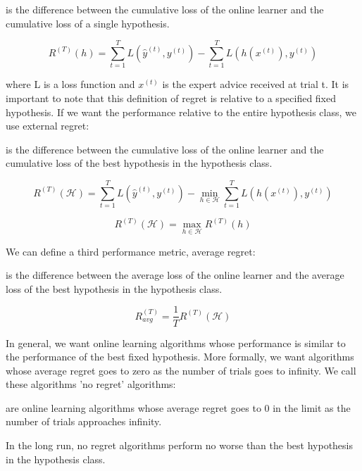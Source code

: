 \documentclass[11pt]{article}
\begin{document}
 is the difference between the cumulative loss of the online learner and the cumulative loss of a single hypothesis. 

$$R^{(T)}(h) = \sum_{t=1}^{T} L(\hat{y}^{(t)}, y^{(t)}) - \sum_{t=1}^{T}L(h({x}^{(t)}), y^{(t)})$$

\normalfont

where L is a loss function and ${x}^{(t)}$ is the expert advice received at trial t. It is important to note that this definition of regret is relative to a specified fixed hypothesis. If we want the performance relative to the entire hypothesis class, we use external regret:

 is the difference between the cumulative loss of the online learner and the cumulative loss of the best hypothesis in the hypothesis class. 

$$R^{(T)}(\mathcal{H}) = \sum_{t=1}^{T} L(\hat{y}^{(t)}, y^{(t)}) - \min_{h \in \mathcal{H}} \sum_{t=1}^{T}L(h({x}^{(t)}), y^{(t)})$$

$$R^{(T)}(\mathcal{H}) = \max_{h \in \mathcal{H}} R^{(T)}(h)$$

\normalfont
We can define a third performance metric, average regret:

 is the difference between the average loss of the online learner and the average loss of the best hypothesis in the hypothesis class. 

$$R^{(T)}_{avg} = \frac{1}{T} R^{(T)}(\mathcal{H})$$

\normalfont

In general, we want online learning algorithms whose performance is similar to the performance of the best fixed hypothesis. More formally, we want algorithms whose average regret goes to zero as the number of trials goes to infinity. We call these algorithms 'no regret' algorithms:

 are online learning algorithms whose average regret goes to 0 in the limit as the number of trials approaches infinity. 

\normalfont
In the long run, no regret algorithms perform no worse than the best hypothesis in the hypothesis class. 

{


}
\end{document}
